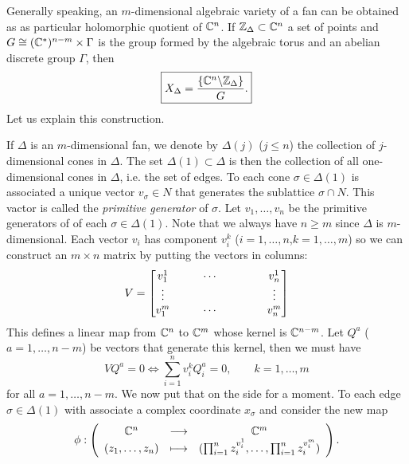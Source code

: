             Generally speaking, an $m$-dimensional algebraic variety of a fan can be obtained as as particular holomorphic quotient of $\mathbb{C}^n$. If $\mathbb{Z}_\Delta\subset\mathbb{C}^n$ a set of points and $G\cong (\mathbb{C}^*)^{n-m}\times\Gamma$ is the group formed by the algebraic torus and an abelian discrete group $\Gamma$, then
            \begin{equation}
                \boxed{X_\Delta=\frac{\{\mathbb{C}^n\backslash\mathbb{Z}_\Delta\}}{G}.}\label{eq:toricvargenform}
            \end{equation}
            Let us explain this construction.
            
            If $\Delta$ is an $m$-dimensional fan, we denote by $\Delta(j)$ ($j\leq n$) the collection of $j$-dimensional cones in $\Delta$. The set $\Delta(1)\subset\Delta$ is then the collection of all one-dimensional cones in $\Delta$, i.e. the set of edges. To each cone $\sigma\in\Delta(1)$ is associated a unique vector $v_\sigma\in N$ that generates the sublattice $\sigma\cap N$. This vactor is called the \emph{primitive generator} of $\sigma$. Let $v_1,\dots,v_n$ be the primitive generators of of each $\sigma\in\Delta(1)$. Note that we always have $n\geq m$ since $\Delta$ is $m$-dimensional. Each vector $v_i$ has component $v^k_i$ ($i=1,\dots,n$,$k=1,\dots,m$) so we can construct an $m\times n$ matrix by putting the vectors in columns:
            \begin{equation}
                V=
                \begin{bmatrix}
                    v^1_1 & & & \cdots & \hspace{0.5cm} & & v^1_n \\
                    \vdots & & & & & & \vdots \\
                    v^m_1 & & & \cdots & & & v^m_n
                \end{bmatrix}
            \end{equation}
            This defines a linear map from $\mathbb{C}^n$ to $\mathbb{C}^m$ whose kernel is $\mathbb{C}^{n-m}$. Let $Q^a$ ($a=1,\dots,n-m$) be vectors that generate this kernel, then we must have
            \begin{equation}
                VQ^a=0\Leftrightarrow \sum^n_{i=1}v^k_i Q^a_i=0,\qquad k=1,\dots,m\label{eq:detQalpha}
            \end{equation}
            for all $a=1,\dots,n-m$. We now put that on the side for a moment. To each edge $\sigma\in\Delta(1)$ with associate a complex coordinate $x_\sigma$
            and consider the new map
            \begin{equation}
                \phi:\left(
                \begin{array}{ccc}
                    \mathbb{C}^n & \longrightarrow & \mathbb{C}^m \\
                    (z_1,\dots,z_n) & \longmapsto & (\prod^n_{i=1}z^{v^1_i}_i,\dots,\prod^n_{i=1}z^{v^m_i}_i)
                \end{array}
                \right).
            \end{equation}
